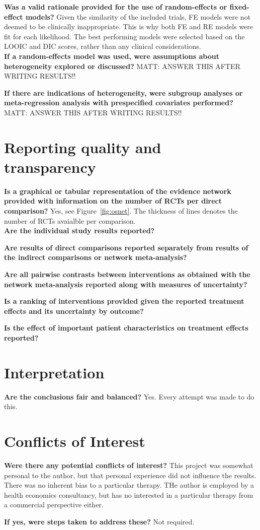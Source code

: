 \textbf{Was a valid rationale provided for the use of random-effects
or fixed-effect models?} Given the similarity of the included trials, FE models were not deemed to be clinically inappropriate. This is why both FE and RE models were fit for each likelihood. The best performing models were selected based on the LOOIC and DIC scores, rather than any clinical considerations. \\

\textbf{If a random-effects model was used, were assumptions
about heterogeneity explored or discussed?} MATT: ANSWER THIS AFTER WRITING RESULTS!!

\textbf{If there are indications of heterogeneity, were subgroup
analyses or meta-regression analysis with prespecified
covariates performed?} MATT: ANSWER THIS AFTER WRITING RESULTS!!

\section{Reporting quality and transparency}

\textbf{Is a graphical or tabular representation of the evidence
network provided with information on the number of RCTs per
direct comparison?} Yes, see Figure~\ref{fig:osnet}. The thickness of lines denotes the number of RCTs avaialble per comparison. \\

\textbf{Are the individual study results reported?}

\textbf{Are results of direct comparisons reported separately from
results of the indirect comparisons or network meta-analysis?}

\textbf{Are all pairwise contrasts between interventions as obtained
with the network meta-analysis reported along with measures
of uncertainty?}

\textbf{Is a ranking of interventions provided given the reported
treatment effects and its uncertainty by outcome?}

\textbf{Is the effect of important patient characteristics on treatment
effects reported?}

\section{Interpretation}

\textbf{Are the conclusions fair and balanced?} Yes. Every attempt was made to do this. 

\section{Conflicts of Interest}

\textbf{Were there any potential conflicts of interest?} This project was somewhat personal to the author, but that personal experience did not influence the results. There was no inherent bias to a particular therapy. THe author is employed by a health economics consultancy, but has no interested in a particular therapy from a commercial perspective either.

\textbf{If yes, were steps taken to address these?} Not required.